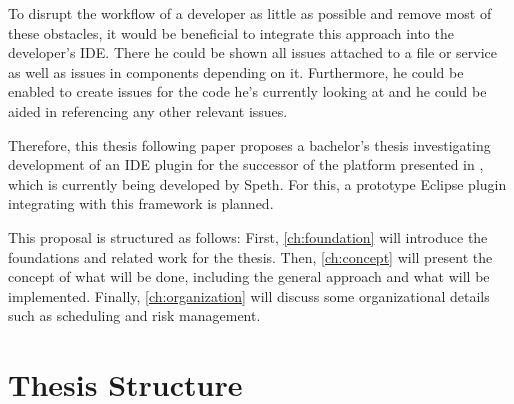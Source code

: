 To disrupt the workflow of a developer as little as possible and remove most of these obstacles, it would be beneficial to integrate this approach into the developer's \gls{IDE}. There he could be shown all issues attached to a file or service as well as issues in components depending on it. Furthermore, he could be enabled to create issues for the code he's currently looking at and he could be aided in referencing any other relevant issues. 

Therefore, this thesis following paper proposes a bachelor's thesis investigating development of an \ac{IDE} plugin for the successor of the  platform presented in \cite{Speth2019}, which is currently being developed by Speth. For this, a prototype Eclipse plugin integrating with this framework is planned.

This proposal is structured as follows: First, \autoref{ch:foundation} will introduce the foundations and related work for the thesis. Then, \autoref{ch:concept} will present the concept of what will be done, including the general approach and what will be implemented. Finally, \autoref{ch:organization} will discuss some organizational details such as scheduling and risk management.

\section*{Thesis Structure}
